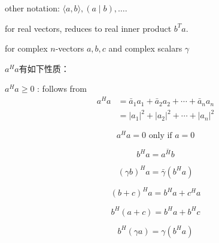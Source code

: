 other notation: $ \langle a, b\rangle,(a \mid b), \ldots $.

for real vectors, reduces to real inner product $ b^{T} a $.

for complex $ n $-vectors $ a, b, c $ and complex scalars $ \gamma $

$a^H a$有如下性质：
\begin{theorem}
    $ a^{H} a \geq 0 $ : follows from
$$
\begin{aligned}
a^{H} a &=\bar{a}_{1} a_{1}+\bar{a}_{2} a_{2}+\cdots+\bar{a}_{n} a_{n} \\
&=\left|a_{1}\right|^{2}+\left|a_{2}\right|^{2}+\cdots+\left|a_{n}\right|^{2}
\end{aligned}
$$

\end{theorem}

\begin{theorem}
    $$ a^{H} a=0 \text{ only if } a=0 $$
\end{theorem}

\begin{theorem}
    $$ b^{H} a=\overline{a^{H} b} $$
\end{theorem}

\begin{theorem}
    $$ (\gamma b)^{H} a=\bar{\gamma}\left(b^{H} a\right) $$
\end{theorem}

\begin{theorem}
    $$ (b+c)^{H} a=b^{H} a+c^{H} a $$
\end{theorem}

\begin{theorem}
    $$ b^{H}(a+c)=b^{H} a+b^{H} c $$
\end{theorem}

\begin{theorem}
    $$ b^{H}(\gamma a)=\gamma\left(b^{H} a\right) $$
\end{theorem}